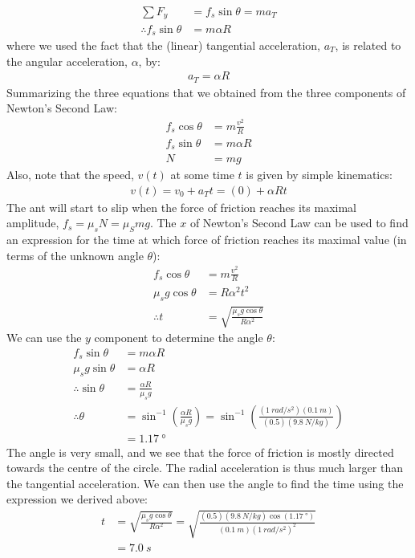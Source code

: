 \begin{example}
\begin{align*}
\sum F_y &= f_s\sin\theta = ma_T \\
\therefore f_s\sin\theta &= m\alpha R
\end{align*}
where we used the fact that the (linear) tangential acceleration, $a_T$, is related to the angular acceleration, $\alpha$, by:
\begin{align*}
a_T = \alpha R
\end{align*}
Summarizing the three equations that we obtained from the three components of Newton's Second Law:
\begin{align*}
f_s\cos\theta &= m\frac{v^2}{R}\\
f_s\sin\theta &= m\alpha R\\
N&=mg
\end{align*}
Also, note that the speed, $v(t)$ at some time $t$ is given by simple kinematics:
\begin{align*}
v(t)=v_0+a_Tt=(0)+\alpha R t
\end{align*}
The ant will start to slip when the force of friction reaches its maximal amplitude, $f_s=\mu_sN=\mu_Smg$. The $x$ of Newton's Second Law can be used to find an expression for the time at which force of friction reaches its maximal value (in terms of the unknown angle $\theta$):
\begin{align*}
f_s\cos\theta &= m\frac{v^2}{R}\\
\mu_sg\cos\theta &= R\alpha^2t^2\\
\therefore t &= \sqrt{\frac{\mu_sg\cos\theta}{R\alpha^2}}
\end{align*}
We can use the $y$ component to determine the angle $\theta$:
\begin{align*}
f_s\sin\theta &= m\alpha R\\
\mu_sg\sin\theta &= \alpha R\\
\therefore \sin\theta &= \frac{\alpha R}{\mu_s g}\\
\therefore \theta &= \sin^{-1}\left( \frac{\alpha R}{\mu_s g}  \right)=\sin^{-1}\left( \frac{(\SI{1}{rad/s^2})(\SI{0.1}{m})}{(0.5)(\SI{9.8}{N/kg})}  \right)\\
&=\SI{1.17}{\degree}
\end{align*}
The angle is very small, and we see that the force of friction is mostly directed towards the centre of the circle. The radial acceleration is thus much larger than the tangential acceleration. We can then use the angle to find the time using the expression we derived above:
\begin{align*}
t &= \sqrt{\frac{\mu_sg\cos\theta}{R\alpha^2}}= \sqrt{\frac{(0.5)(\SI{9.8}{N/kg})\cos(\SI{1.17}{\degree})}{(\SI{0.1}{m})(\SI{1}{rad/s^2})^2}}\\
&=\SI{7.0}{s}
\end{align*}
\end{example}


